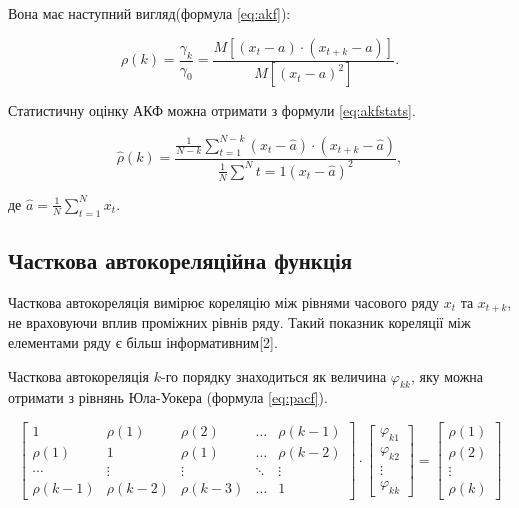 Вона має наступний вигляд(формула \ref{eq:akf}):

\begin{equation}\label{eq:akf}
\rho(k) = \frac{\gamma_{k}}{\gamma_{0}} = \frac{M[(x_{t} - a) \cdot (x_{t+k} - a)]}{M[(x_{t} - a)^{2}]}.
\end{equation}

Статистичну оцінку АКФ можна отримати з формули \ref{eq:akfstats}.

\begin{equation}\label{eq:akfstats}
\hat{\rho}(k) = \frac{\frac{1}{N-k}\sum^{N-k}_{t=1}(x_{t} - \hat{a}) \cdot (x_{t+k} - \hat{a})}{\frac{1}{N}\sum^{N}{t=1}(x_{t} - \hat{a})^{2}},
\end{equation}

\noindent де $\hat{a} = \frac{1}{N}\sum^{N}_{t=1}x_{t}$.

\subsection{Часткова автокореляційна функція}

Часткова автокореляція вимірює кореляцію між рівнями часового ряду $x_{t}$ та $x_{t+k}$, не враховуючи вплив проміжних рівнів ряду. Такий показник кореляції між елементами ряду є більш інформативним[2].

Часткова автокореляція $k$-го порядку знаходиться як величина $\varphi_{kk}$, яку можна отримати з рівнянь Юла-Уокера (формула \ref{eq:pacf}).

\begin{equation}\label{eq:pacf}
\left[
\begin{array}{ccccc}
1 & \rho(1) & \rho(2) & \dots & \rho(k-1) \\
\rho(1) & 1 & \rho(1) & \dots & \rho(k-2) \\
\cdots & \vdots & \vdots & \ddots & \vdots \\
\rho(k-1) & \rho(k-2) & \rho(k-3) & \dots & 1
\end{array}
\right] \cdot
\left[
\begin{array}{c}
\varphi_{k1} \\
\varphi_{k2} \\
\vdots \\
\varphi_{kk}
\end{array}
\right]
=
\left[
\begin{array}{c}
\rho(1) \\
\rho(2) \\
\vdots \\
\rho(k)
\end{array}
\right]
\end{equation}

